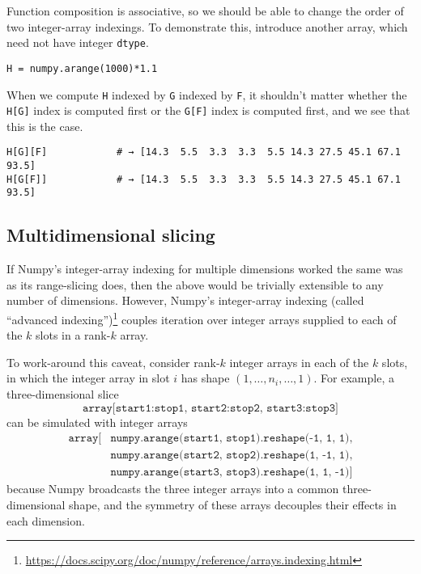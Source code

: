 \documentclass[12pt]{article}
\begin{document}
Function composition is associative, so we should be able to change the order of two integer-array indexings. To demonstrate this, introduce another array, which need not have integer \texttt{dtype}.
\begin{verbatim}
H = numpy.arange(1000)*1.1
\end{verbatim}
\noindent When we compute \texttt{H} indexed by \texttt{G} indexed by \texttt{F}, it shouldn't matter whether the \texttt{H[G]} index is computed first or the \texttt{G[F]} index is computed first, and we see that this is the case.
\begin{verbatim}
H[G][F]            # → [14.3  5.5  3.3  3.3  5.5 14.3 27.5 45.1 67.1 93.5]
H[G[F]]            # → [14.3  5.5  3.3  3.3  5.5 14.3 27.5 45.1 67.1 93.5]
\end{verbatim}

\subsection*{Multidimensional slicing}

If Numpy's integer-array indexing for multiple dimensions worked the same was as its range-slicing does, then the above would be trivially extensible to any number of dimensions. However, Numpy's integer-array indexing (called ``advanced indexing'')\footnote{\url{https://docs.scipy.org/doc/numpy/reference/arrays.indexing.html}} couples iteration over integer arrays supplied to each of the $k$ slots in a rank-$k$ array.

To work-around this caveat, consider rank-$k$ integer arrays in each of the $k$ slots, in which the integer array in slot $i$ has shape $(1, \ldots, n_i, \ldots, 1)$. For example, a three-dimensional slice
\[ \texttt{array[start1:stop1, start2:stop2, start3:stop3]} \]
\noindent can be simulated with integer arrays
\begin{align*}
\texttt{array[} & \texttt{numpy.arange(start1, stop1).reshape(-1, 1, 1),} \\
                            & \texttt{numpy.arange(start2, stop2).reshape(1, -1, 1),} \\
                            & \texttt{numpy.arange(start3, stop3).reshape(1, 1, -1)]}
\end{align*}
\noindent because Numpy broadcasts the three integer arrays into a common three-dimensional shape, and the symmetry of these arrays decouples their effects in each dimension.
\end{document}
